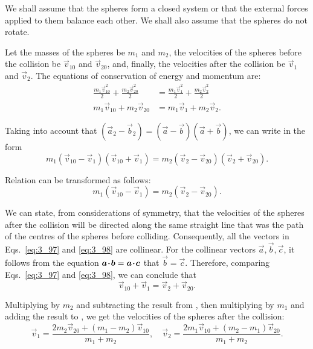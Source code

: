 We shall assume that the spheres form a closed system or that the external forces applied to them balance each other. We shall also assume that the spheres do not rotate.

Let the masses of the spheres be $m_1$ and $m_2$, the velocities of the spheres before the collision be $\vec{v}_{10}$ and $\vec{v}_{20}$, and, finally, the velocities after the collision be $\vec{v}_{1}$ and $\vec{v}_{2}$. The equations of conservation of energy and momentum are:
\begin{align}
\frac{m_1\vec{v}_{10}^2}{2} + \frac{m_2\vec{v}_{20}^2}{2} &= \frac{m_1\vec{v}_{1}^2}{2} + \frac{m_2\vec{v}_{2}^2}{2}\label{eq:3_95}\\
m_1\vec{v}_{10} + m_2\vec{v}_{20} &= m_1\vec{v}_{1} + m_2\vec{v}_{2}.\label{eq:3_96}
\end{align}

\noindent
Taking into account that $(\vec{a}_2-\vec{b}_2)=(\vec{a}-\vec{b})(\vec{a}+\vec{b})$, we can write  in the form
\begin{equation}\label{eq:3_97}
m_1(\vec{v}_{10}-\vec{v}_{1})(\vec{v}_{10}+\vec{v}_{1}) = m_2(\vec{v}_{2}-\vec{v}_{20})(\vec{v}_{2}+\vec{v}_{20}).
\end{equation}

\noindent
Relation  can be transformed as follows:
\begin{equation}\label{eq:3_98}
m_1(\vec{v}_{10}-\vec{v}_{1}) = m_2(\vec{v}_{2}-\vec{v}_{20}).
\end{equation}

We can state, from considerations of symmetry, that the velocities of the spheres after the collision will be directed along the same straight line that was the path of the centres of the spheres before colliding. Consequently, all the vectors in Eqs.~\eqref{eq:3_97} and \eqref{eq:3_98} are collinear. For the collinear vectors $\vec{a}, \vec{b}, \vec{c}$, it follows from the equation $\boldsymbol{a\!\cdot\!b}=\boldsymbol{a\!\cdot\!c}$ that $\vec{b}=\vec{c}$. Therefore, comparing Eqs.~\eqref{eq:3_97} and \eqref{eq:3_98}, we can conclude that
\begin{equation}\label{eq:3_99}
\vec{v}_{10} + \vec{v}_{1} = \vec{v}_{2} + \vec{v}_{20}.
\end{equation}

\noindent
Multiplying  by $m_2$ and subtracting the result from , then multiplying  by $m_1$ and adding the result to , we get the velocities of the spheres after the collision:
\begin{equation}\label{eq:3_100}
\vec{v}_1 = \frac{2m_2\vec{v}_{20}+(m_1-m_2)\vec{v}_{10}}{m_1+m_2},\quad \vec{v}_2 = \frac{2m_1\vec{v}_{10}+(m_2-m_1)\vec{v}_{20}}{m_1+m_2}.
\end{equation}

